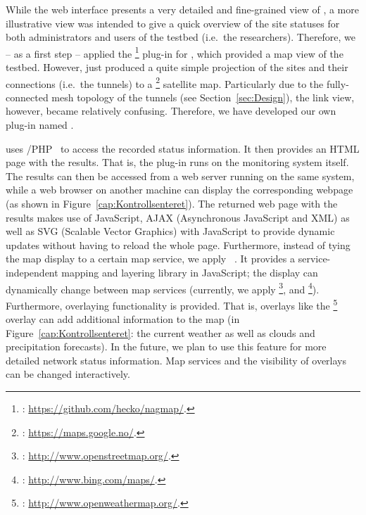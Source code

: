 While the web interface presents a very detailed and fine-grained view of , a more illustrative view was intended to give a quick overview of the site statuses for both administrators and users of the testbed (i.e.\ the researchers). Therefore, we -- as a first step -- applied the \footnote{: \url{https://github.com/hecko/nagmap/}.} plug-in for , which provided a map view of the  testbed. However,  just produced a quite simple projection of the sites and their connections (i.e.\ the tunnels) to a \footnote{: \url{https://maps.google.no/}.} satellite map. Particularly due to the fully-connected mesh topology of the tunnels (see Section~\ref{sec:Design}), the link view, however, became relatively confusing. Therefore, we have developed our own plug-in named .

 uses /PHP~\cite{ApacheDoc} to access the recorded  status information. It then provides an HTML page with the results. That is, the plug-in runs on the monitoring system itself. The results can then be accessed from a web server running on the same system, while a web browser on another machine can display the corresponding webpage (as shown in Figure~\ref{cap:Kontrollsenteret}). The returned web page with the results makes use of JavaScript, AJAX (Asynchronous JavaScript and XML) as well as SVG (Scalable Vector Graphics) with JavaScript to provide dynamic updates without having to reload the whole page. Furthermore, instead of tying the map display to a certain map service, we apply ~\cite{OpenLayersDoc}. It provides a service-independent mapping and layering library in JavaScript; the display can dynamically change between map services (currently, we apply 
\footnote{: \url{http://www.openstreetmap.org/}.},
 and
\footnote{: \url{http://www.bing.com/maps/}.}). Furthermore, overlaying functionality is provided. That is, overlays like the \footnote{: \url{http://www.openweathermap.org/}.} overlay can add additional information to the map (in Figure~\ref{cap:Kontrollsenteret}: the current weather as well as clouds and precipitation forecasts). In the future, we plan to use this feature for more detailed network status information. Map services and the visibility of overlays can be changed interactively.

